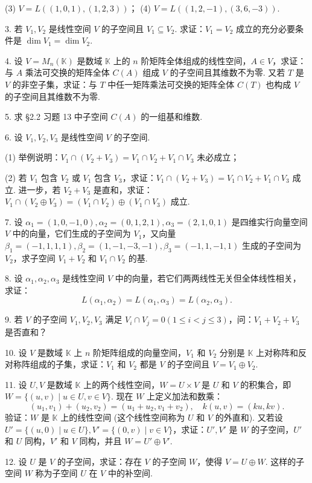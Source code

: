\documentclass[UTF8,12pt,a4paper,fontset=fandol]{ctexart}
\begin{document}
(3) $V=L((1,0,1),(1,2,3))$；\qquad
(4) $V=L((1,2,-1),(3,6,-3))$.

3. 若 $V_1,V_2$ 是线性空间 $V$ 的子空间且 $V_1\subseteq V_2$. 求证：$V_1=V_2$ 成立的充分必要条件是 $\dim V_1=\dim V_2$.

4. 设 $V=M_n(\mathbb{K})$ 是数域 $\mathbb{K}$ 上的 $n$ 阶矩阵全体组成的线性空间，$A\in V$，求证：与 $A$ 乘法可交换的矩阵全体 $C(A)$ 组成 $V$ 的子空间且其维数不为零. 又若 $T$ 是 $V$ 的非空子集，求证：与 $T$ 中任一矩阵乘法可交换的矩阵全体 $C(T)$ 也构成 $V$ 的子空间且其维数不为零.

5. 求 §2.2 习题 13 中子空间 $C(A)$ 的一组基和维数.

6. 设 $V_1,V_2,V_3$ 是线性空间 $V$ 的子空间.

(1) 举例说明：$V_1\cap(V_2+V_3)=V_1\cap V_2+V_1\cap V_3$ 未必成立；

(2) 若 $V_1$ 包含 $V_2$ 或 $V_1$ 包含 $V_3$，求证：$V_1\cap(V_2+V_3)=V_1\cap V_2+V_1\cap V_3$ 成立. 进一步，若 $V_2+V_3$ 是直和，求证：$V_1\cap(V_2\oplus V_3)=(V_1\cap V_2)\oplus(V_1\cap V_3)$ 成立.

7. 设 $\alpha_1=(1,0,-1,0),\alpha_2=(0,1,2,1),\alpha_3=(2,1,0,1)$ 是四维实行向量空间 $V$ 中的向量，它们生成的子空间为 $V_1$，又向量 $\beta_1=(-1,1,1,1),\beta_2=(1,-1,-3,-1),\beta_3=(-1,1,-1,1)$ 生成的子空间为 $V_2$，求子空间 $V_1+V_2$ 和 $V_1\cap V_2$ 的基.

8. 设 $\alpha_1,\alpha_2,\alpha_3$ 是线性空间 $V$ 中的向量，若它们两两线性无关但全体线性相关，求证：
\[
L(\alpha_1,\alpha_2)=L(\alpha_1,\alpha_3)=L(\alpha_2,\alpha_3).
\]

9. 若 $V$ 的子空间 $V_1,V_2,V_3$ 满足 $V_i\cap V_j=0(1\leq i<j\leq 3)$，问：$V_1+V_2+V_3$ 是否直和？

10. 设 $V$ 是数域 $\mathbb{K}$ 上 $n$ 阶矩阵组成的向量空间，$V_1$ 和 $V_2$ 分别是 $\mathbb{K}$ 上对称阵和反对称阵组成的子集，求证：$V_1$ 和 $V_2$ 都是 $V$ 的子空间且 $V=V_1\oplus V_2$.

11. 设 $U,V$ 是数域 $\mathbb{K}$ 上的两个线性空间，$W=U\times V$ 是 $U$ 和 $V$ 的积集合，即 $W=\{(u,v)\mid u\in U,v\in V\}$. 现在 $W$ 上定义加法和数乘：
\[
(u_1,v_1)+(u_2,v_2)=(u_1+u_2,v_1+v_2),\quad k(u,v)=(ku,kv).
\]
验证：$W$ 是 $\mathbb{K}$ 上的线性空间 (这个线性空间称为 $U$ 和 $V$ 的外直和). 又若设 $U'=\{(u,0)\mid u\in U\},V'=\{(0,v)\mid v\in V\}$，求证：$U',V'$ 是 $W$ 的子空间，$U'$ 和 $U$ 同构，$V'$ 和 $V$ 同构，并且 $W=U'\oplus V'$.

12. 设 $U$ 是 $V$ 的子空间，求证：存在 $V$ 的子空间 $W$，使得 $V=U\oplus W$. 这样的子空间 $W$ 称为子空间 $U$ 在 $V$ 中的补空间.
\end{document}
